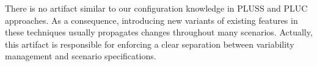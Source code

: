 \documentclass{acm_proc_article-sp}
\begin{document}
There is no artifact similar to our configuration knowledge in
PLUSS and PLUC approaches. As a consequence, introducing new variants of existing 
features in these techniques usually propagates changes throughout many
scenarios. Actually, this artifact is responsible for enforcing a clear
separation between variability management and scenario specifications.

% 
% 
% 
% 
\end{document}

